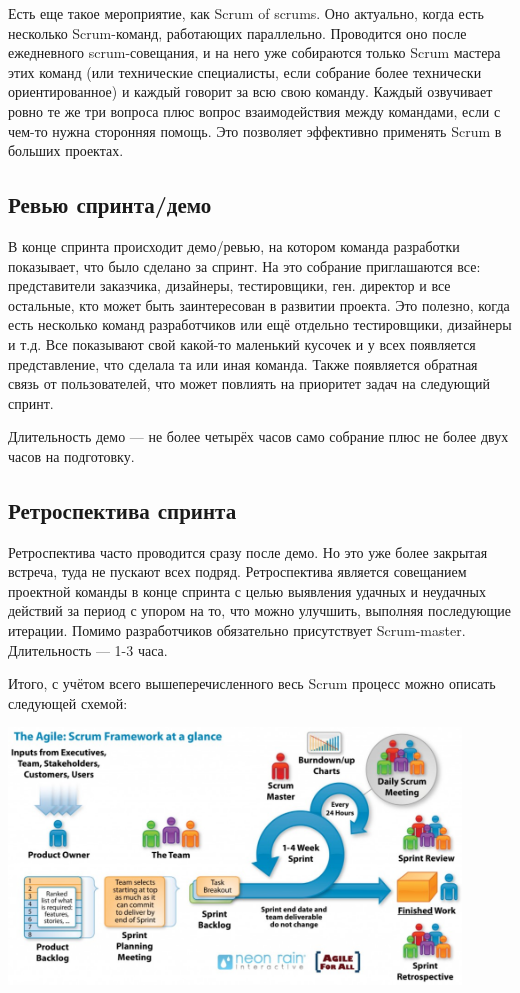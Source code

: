 \documentclass{../../text-style}
\begin{document}
Есть еще такое мероприятие, как Scrum of scrums. Оно актуально, когда есть несколько Scrum-команд, работающих параллельно. Проводится оно после ежедневного scrum-совещания, и на него уже собираются только Scrum мастера этих команд (или технические специалисты, если собрание более технически ориентированное) и каждый говорит за всю свою команду. Каждый озвучивает ровно те же три вопроса плюс вопрос взаимодействия между командами, если с чем-то нужна сторонняя помощь. Это позволяет эффективно применять Scrum в больших проектах.

\subsection{Ревью спринта/демо}

В конце спринта происходит демо/ревью, на котором команда разработки показывает, что было сделано за спринт. На это собрание приглашаются все: представители заказчика, дизайнеры, тестировщики, ген. директор и все остальные, кто может быть заинтересован в развитии проекта. Это полезно, когда есть несколько команд разработчиков или ещё отдельно тестировщики, дизайнеры и т.д. Все показывают свой какой-то маленький кусочек и у всех появляется представление, что сделала та или иная команда. Также появляется обратная связь от пользователей, что может повлиять на приоритет задач на следующий спринт. 

Длительность демо --- не более четырёх часов само собрание плюс не более двух часов на подготовку.

\subsection{Ретроспектива спринта}

Ретроспектива часто проводится сразу после демо. Но это уже более закрытая встреча, туда не пускают всех подряд. Ретроспектива является совещанием проектной команды в конце спринта с целью выявления удачных и неудачных действий за период с упором на то, что можно улучшить, выполняя последующие итерации. Помимо разработчиков обязательно присутствует Scrum-master. Длительность --- 1-3 часа.

Итого, с учётом всего вышеперечисленного весь Scrum процесс можно описать следующей схемой:

\begin{center}
    \includegraphics[width=0.9\textwidth]{scrumProcess.png}
\end{center}
\end{document}
